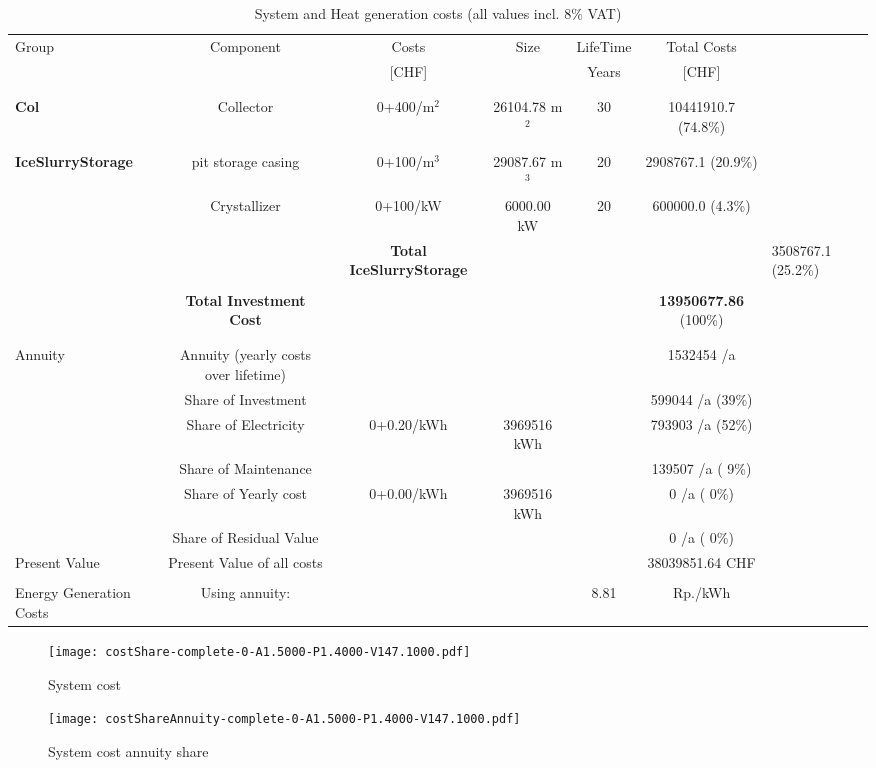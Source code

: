 \documentclass[english]{SPFShortReport}
\begin{document}
\begin{table}[!ht]
\centering
\caption{System and Heat generation costs (all values incl. 8$\%$ VAT) }
\begin{adjustbox}{max width =\textwidth}
\begin{tabular}{l | c c c c c } 
\hline
\hline
Group &Component &Costs &Size &LifeTime &Total Costs \\ 
 & &[CHF] & &Years &[CHF]\\ 
\hline
\\
\hline \\
\textbf{Col} & Collector & 0+400/m$^2$ & 26104.78 m$^2$ & 30 & 10441910.7 (74.8\%) \\
\hline \\
\hline \\
\textbf{IceSlurryStorage} & pit storage casing & 0+100/m$^3$ & 29087.67 m$^3$ & 20 & 2908767.1 (20.9\%) \\
 & Crystallizer & 0+100/kW & 6000.00 kW & 20 & 600000.0 (4.3\%) \\
&
 & \textbf{Total IceSlurryStorage} & & & & 3508767.1 (25.2\%) \\
\hline \\
 & \textbf{Total Investment Cost} & & & & \textbf{13950677.86} (100\%) \\ 
\hline \\ 
\hline \\ 
Annuity & Annuity (yearly costs over lifetime)  &&& & 1532454 /a  \\
 & Share of Investment & &&& 599044 /a (39\%) \\
 & Share of Electricity & 0+0.20/kWh & 3969516 kWh &  & 793903 /a (52\%)\\
 & Share of Maintenance & &&& 139507 /a ( 9\%)\\ 
 & Share of Yearly cost & 0+0.00/kWh & 3969516 kWh & &  0 /a ( 0\%)\\
 & Share of Residual Value &&& &  0 /a ( 0\%)\\
Present Value  & Present Value of all costs  & &&& 38039851.64 CHF \\
\hline \\ 
 Energy Generation Costs & Using annuity: &&& 8.81 & Rp./kWh \\
\hline
\hline
\end{tabular}
\end{adjustbox}
\label{CostsTable}
\end{table}
\begin{figure}[!htbp]
\begin{center}
\texttt{[image: costShare-complete-0-A1.5000-P1.4000-V147.1000.pdf]}
\caption{System cost}
\label{systemCost}
\end{center}
\end{figure}
\begin{figure}[!htbp]
\begin{center}
\texttt{[image: costShareAnnuity-complete-0-A1.5000-P1.4000-V147.1000.pdf]}
\caption{System cost annuity share}
\label{systemCostannuity}
\end{center}
\end{figure}
\end{document}
